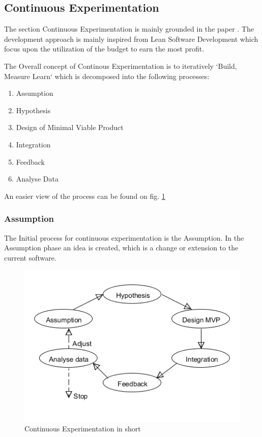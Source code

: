 \documentclass{sig-alternate}
\begin{document}
\subsection{Continuous Experimentation}
The section Continuous Experimentation is mainly grounded in the paper \cite{bowman:reasoning}.
The development approach is mainly inspired from Lean Software Development which focus upon 
the utilization of the budget to earn the most profit.

The Overall concept of Continous Experimentation is to iteratively `Build, Measure Learn` which is
decomposed into the following processes: 
\begin{enumerate}
\item Assumption
\item Hypothesis
\item Design of Minimal Viable Product
\item Integration
\item Feedback
\item Analyse Data
\end{enumerate}

An easier view of the process can be found on fig. \ref{fig:continuousdev}

\subsubsection{Assumption}
\label{cx:assumption}
The Initial process for continuous experimentation is the Assumption.
In the Assumption phase an idea is created, which is a change or extension to the current software.

\begin{figure}
\centering
\caption{Continuous Experimentation in short}
\label{fig:continuousdev}
\includegraphics[scale=0.5]{Umlet/conexp}
\end{figure}
\end{document}
